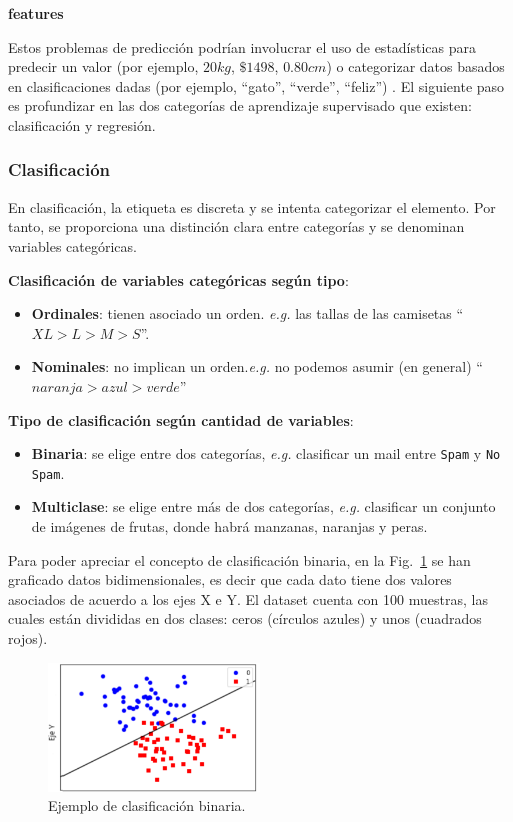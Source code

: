 \documentclass[a4paper,12pt]{article}
\begin{document}
\textbf{features}

Estos problemas de predicción podrían involucrar el uso de estadísticas para predecir un valor (por ejemplo, $20 kg$, $\$1498$, $0.80 cm$) o categorizar datos basados en clasificaciones dadas (por ejemplo, ``gato'', ``verde'', ``feliz'') \cite{norman2019aprendizaje}.  El siguiente paso es profundizar en las dos categorías de aprendizaje supervisado que existen: clasificación y regresión.

\subsubsection{Clasificación}

En clasificación, la etiqueta es discreta y se intenta categorizar el elemento. Por tanto, se proporciona una distinción clara entre categorías y se denominan variables categóricas.

\textbf{Clasificación de variables categóricas según tipo}: 
\begin{itemize}[noitemsep, topsep=2pt]
	\item \textbf{Ordinales}: tienen asociado un orden. \textit{e.g.} las tallas de las camisetas ``$XL > L > M > S$''.
	\item \textbf{Nominales}: no implican un orden.\textit{e.g.} no podemos asumir (en general) ``$naranja > azul > verde$''
\end{itemize}

\textbf{Tipo de clasificación según cantidad de variables}:
\begin{itemize}[noitemsep, topsep=2pt]
	\item \textbf{Binaria}: se elige entre dos categorías, \textit{e.g.} clasificar un mail entre \texttt{Spam} y \texttt{No Spam}.
	\item \textbf{Multiclase}: se elige entre más de dos categorías, \textit{e.g.} clasificar un conjunto de imágenes de frutas, donde habrá manzanas, naranjas y peras. 
\end{itemize} 

Para poder apreciar el concepto de clasificación binaria, en la Fig.~\ref{fig:binaryclassification.}  \cite{GitHubpa25:online} se han graficado datos bidimensionales, es decir que cada dato tiene dos valores asociados de acuerdo a los ejes X e Y. El dataset cuenta con 100 muestras, las cuales están divididas en dos clases: ceros (círculos azules) y unos (cuadrados rojos). 

\begin{figure}[H]
	\begin{center}				
	\includegraphics[width=0.5\textwidth]{tesis_2.png}
  	\caption{Ejemplo de clasificación binaria.}
  	\label{fig:binaryclassification.}
  	\end{center}
\end{figure}
\end{document}
